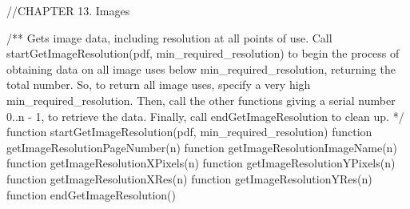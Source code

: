 //CHAPTER 13. Images

/** Gets image data, including resolution at all points of use. Call
startGetImageResolution(pdf, min_required_resolution) to begin the process of
obtaining data on all image uses below min_required_resolution, returning the
total number. So, to return all image uses, specify a very high
min_required_resolution. Then, call the other functions giving a serial number
0..n - 1, to retrieve the data. Finally, call endGetImageResolution to clean
up. */
function startGetImageResolution(pdf, min_required_resolution)
function getImageResolutionPageNumber(n)
function getImageResolutionImageName(n)
function getImageResolutionXPixels(n)
function getImageResolutionYPixels(n)
function getImageResolutionXRes(n)
function getImageResolutionYRes(n)
function endGetImageResolution()
